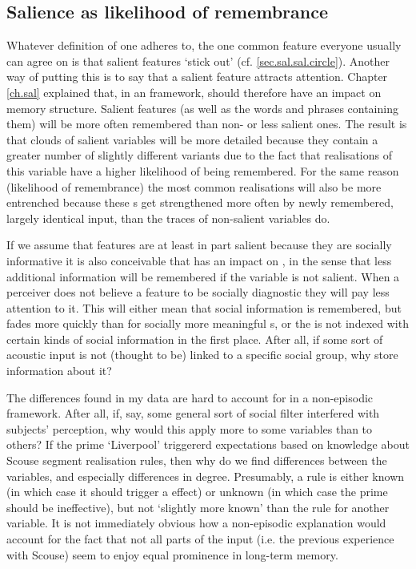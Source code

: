 		\subsection{Salience as likelihood of remembrance}

Whatever definition of  one adheres to, the one common feature everyone usually can agree on is that salient features `stick out' (cf. \ref{sec.sal.sal.circle}).
Another way of putting this is to say that a salient feature attracts attention.
Chapter \ref{ch.sal} explained that, in an  framework,  should therefore have an impact on memory structure.
Salient features (as well as the words and phrases containing them) will be more often remembered than non- or less salient ones.
The result is that  clouds of salient variables will be more detailed because they contain a greater number of slightly different variants due to the fact that realisations of this variable have a higher likelihood of being remembered.
For the same reason (likelihood of remembrance) the most common realisations will also be more entrenched because these s get strengthened more often by newly remembered, largely identical input, than the traces of non-salient variables do.

If we assume that features are at least in part salient because they are socially informative it is also conceivable that  has an impact on , in the sense that less additional information will be remembered if the variable is not salient.
When a perceiver does not believe a feature to be socially diagnostic they will pay less attention to it.
This will either mean that social information is remembered, but fades more quickly than for socially more meaningful s, or the  is not indexed with certain kinds of social information in the first place.
After all, if some sort of acoustic input is not (thought to be) linked to a specific social group, why store information about it?

The  differences found in my data are hard to account for in a non-episodic framework.
After all, if, say, some general sort of social filter \parencite[cf.][]{niedzielski1999} interfered with subjects' perception, why would this apply more to some variables than to others?
If the prime \enquote*{Liverpool} triggererd expectations based on knowledge about Scouse segment realisation rules, then why do we find differences between the variables, and especially differences in degree.
Presumably, a rule is either known (in which case it should trigger a  effect) or unknown (in which case the prime should be ineffective), but not \enquote*{slightly more known} than the rule for another variable.
It is not immediately obvious how a non-episodic explanation would account for the fact that not all parts of the input (i.e. the previous experience with Scouse) seem to enjoy equal prominence in long-term memory.

